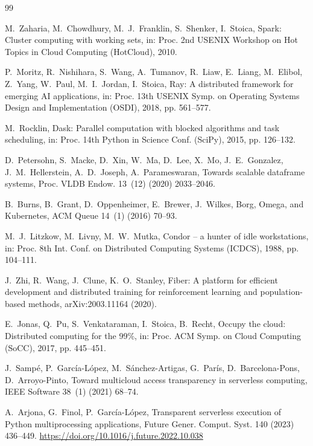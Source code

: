 \documentclass[5p,times,twocolumn]{elsarticle}
\begin{document}
\begin{thebibliography}{99}

 M.~Zaharia, M.~Chowdhury, M.~J.~Franklin, S.~Shenker, I.~Stoica, Spark: Cluster computing with working sets, in: Proc. 2nd USENIX Workshop on Hot Topics in Cloud Computing (HotCloud), 2010.

 P.~Moritz, R.~Nishihara, S.~Wang, A.~Tumanov, R.~Liaw, E.~Liang, M.~Elibol, Z.~Yang, W.~Paul, M.~I.~Jordan, I.~Stoica, Ray: A distributed framework for emerging AI applications, in: Proc. 13th USENIX Symp. on Operating Systems Design and Implementation (OSDI), 2018, pp. 561--577.

 M.~Rocklin, Dask: Parallel computation with blocked algorithms and task scheduling, in: Proc. 14th Python in Science Conf. (SciPy), 2015, pp. 126--132.

 D.~Petersohn, S.~Macke, D.~Xin, W.~Ma, D.~Lee, X.~Mo, J.~E.~Gonzalez, J.~M.~Hellerstein, A.~D.~Joseph, A.~Parameswaran, Towards scalable dataframe systems, Proc. VLDB Endow. 13~(12) (2020) 2033--2046.

 B.~Burns, B.~Grant, D.~Oppenheimer, E.~Brewer, J.~Wilkes, Borg, Omega, and Kubernetes, ACM Queue 14~(1) (2016) 70--93.

 M.~J.~Litzkow, M.~Livny, M.~W.~Mutka, Condor -- a hunter of idle workstations, in: Proc. 8th Int. Conf. on Distributed Computing Systems (ICDCS), 1988, pp. 104--111.

 J.~Zhi, R.~Wang, J.~Clune, K.~O.~Stanley, Fiber: A platform for efficient development and distributed training for reinforcement learning and population-based methods, arXiv:2003.11164 (2020).

 E.~Jonas, Q.~Pu, S.~Venkataraman, I.~Stoica, B.~Recht, Occupy the cloud: Distributed computing for the 99\%, in: Proc. ACM Symp. on Cloud Computing (SoCC), 2017, pp. 445--451.

 J.~Samp\'e, P.~Garc\'ia-L\'opez, M.~S\'anchez-Artigas, G.~Par\'is, D.~Barcelona-Pons, D.~Arroyo-Pinto, Toward multicloud access transparency in serverless computing, IEEE Software 38~(1) (2021) 68--74.

 A.~Arjona, G.~Finol, P.~Garc\'ia-L\'opez, Transparent serverless execution of Python multiprocessing applications, Future Gener. Comput. Syst. 140 (2023) 436--449. \url{https://doi.org/10.1016/j.future.2022.10.038}


\end{thebibliography}
\end{document}
